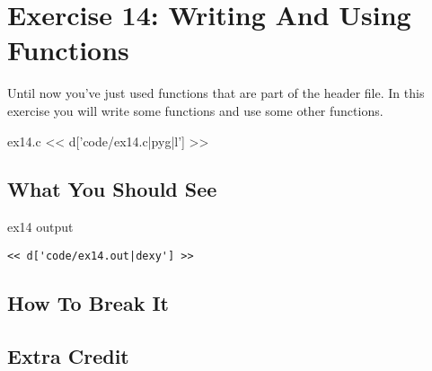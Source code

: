 \chapter{Exercise 14: Writing And Using Functions}

Until now you've just used functions that are part of the
 header file.  In this exercise you will write
some functions and use some other functions.

\begin{code}{ex14.c}
<< d['code/ex14.c|pyg|l'] >>
\end{code}

\section{What You Should See}

\begin{code}{ex14 output}
\begin{lstlisting}
<< d['code/ex14.out|dexy'] >>
\end{lstlisting}
\end{code}


\section{How To Break It}


\section{Extra Credit}




